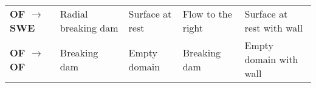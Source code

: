 \begin{frame}
\begin{itemize}
\begin{tcolorbox}[title= \textbf{Scenarios}, colframe=TUMDarkBlue]
\begin{table}[!h]
\begin{tabular}{l|ll|ll}
\textbf{OF $\rightarrow$ SWE}  & Radial breaking dam   & Surface at rest & Flow to the right & Surface at rest with wall   \\[0.1cm]
\textbf{OF $\rightarrow$ OF}   & Breaking dam      & Empty domain & Breaking dam      & Empty domain with wall
\end{tabular}
\end{table}
\end{tcolorbox}

\end{itemize}
\end{frame}


